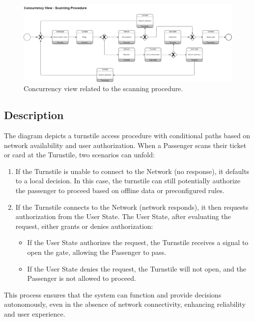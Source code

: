 \begin{figure}[H]
    \centering
    \includegraphics[width=\textwidth]{drawings/views_final_version/concurrency_view_2.png}
    \caption{Concurrency view related to the scanning procedure.}
    \label{fig:concurrency_view_2}
\end{figure}

\subsection*{Description}
The diagram depicts a turnstile access procedure with conditional paths based on network availability and user authorization. When a Passenger scans their ticket or card at the Turnstile, two scenarios can unfold:

\begin{enumerate}
    \item If the Turnstile is unable to connect to the Network (no response), it defaults to a local decision. In this case, the turnstile can still potentially authorize the passenger to proceed based on offline data or preconfigured rules.
    \item If the Turnstile connects to the Network (network responds), it then requests authorization from the User State. The User State, after evaluating the request, either grants or denies authorization:
    \begin{itemize}
        \item If the User State authorizes the request, the Turnstile receives a signal to open the gate, allowing the Passenger to pass.
        \item If the User State denies the request, the Turnstile will not open, and the Passenger is not allowed to proceed.
    \end{itemize}
\end{enumerate}

This process ensures that the system can function and provide decisions autonomously, even in the absence of network connectivity, enhancing reliability and user experience.

